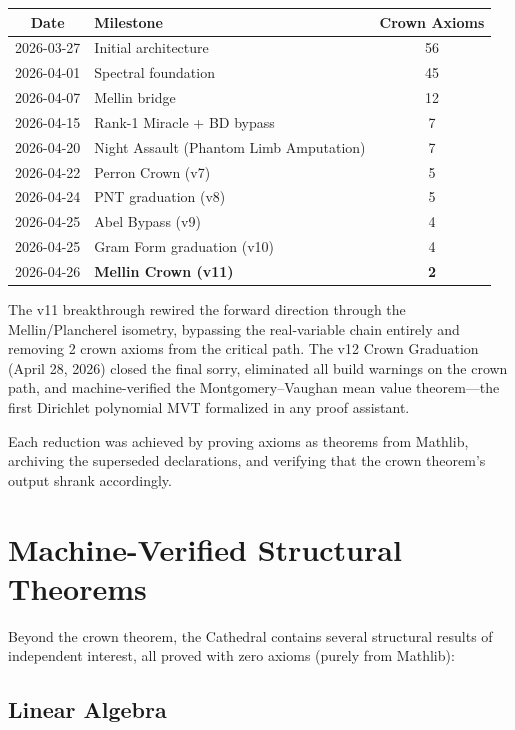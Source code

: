 \documentclass[11pt,a4paper]{article}
\begin{document}
\begin{center}
\begin{tabular}{@{}clc@{}}
\toprule
\textbf{Date} & \textbf{Milestone} & \textbf{Crown Axioms} \\
\midrule
2026-03-27 & Initial architecture & 56 \\
2026-04-01 & Spectral foundation & 45 \\
2026-04-07 & Mellin bridge & 12 \\
2026-04-15 & Rank-1 Miracle + BD bypass & 7 \\
2026-04-20 & Night Assault (Phantom Limb Amputation) & 7 \\
2026-04-22 & Perron Crown (v7) & 5 \\
2026-04-24 & PNT graduation (v8) & 5 \\
2026-04-25 & Abel Bypass (v9) & 4 \\
2026-04-25 & Gram Form graduation (v10) & 4 \\
2026-04-26 & \textbf{Mellin Crown (v11)} & \textbf{2} \\
\bottomrule
\end{tabular}
\end{center}

The v11 breakthrough rewired the forward direction through the
Mellin/Plancherel isometry, bypassing the real-variable chain entirely
and removing 2 crown axioms from the critical path.
The v12 Crown Graduation (April 28, 2026) closed the final
 sorry, eliminated all build
warnings on the crown path, and machine-verified the
Montgomery--Vaughan mean value theorem---the first Dirichlet
polynomial MVT formalized in any proof assistant.

Each reduction was achieved by proving axioms as theorems from
Mathlib, archiving the superseded declarations, and verifying
that the crown theorem's  output shrank
accordingly.

\section{Machine-Verified Structural Theorems}
\label{sec:structural}

Beyond the crown theorem, the Cathedral contains several structural
results of independent interest, all proved with zero axioms
(purely from Mathlib):

\subsection{Linear Algebra}
\end{document}
